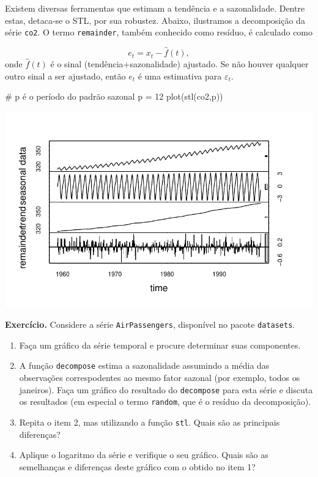 \documentclass[
  letterpaper,
  DIV=11,
  numbers=noendperiod]{scrreprt}
\newenvironment{Shaded}{\begin{snugshade}}{\end{snugshade}}
\newcommand{\CommentTok}[1]{\textcolor[rgb]{0.37,0.37,0.37}{#1}}
\newcommand{\DecValTok}[1]{\textcolor[rgb]{0.68,0.00,0.00}{#1}}
\newcommand{\FunctionTok}[1]{\textcolor[rgb]{0.28,0.35,0.67}{#1}}
\newcommand{\NormalTok}[1]{\textcolor[rgb]{0.00,0.23,0.31}{#1}}
\newcommand{\OtherTok}[1]{\textcolor[rgb]{0.00,0.23,0.31}{#1}}
\begin{document}
Existem diversas ferramentas que estimam a tendência e a sazonalidade.
Dentre estas, detaca-se o STL, por sua robustez. Abaixo, ilustramos a
decomposição da série \texttt{co2}. O termo \texttt{remainder}, também
conhecido como resíduo, é calculado como

\[e_t=x_t-\hat{f}(t),\] onde \(\hat{f}(t)\) é o sinal
(tendência+sazonalidade) ajustado. Se não houver qualquer outro sinal a
ser ajustado, então \(e_t\) é uma estimativa para \(\varepsilon_t\).

\begin{Shaded}
\begin{Highlighting}[]
\CommentTok{\# p é o período do padrão sazonal}
\NormalTok{p }\OtherTok{=} \DecValTok{12}
\FunctionTok{plot}\NormalTok{(}\FunctionTok{stl}\NormalTok{(co2,p))}
\end{Highlighting}
\end{Shaded}

\includegraphics{sinal_files/figure-pdf/unnamed-chunk-2-1.pdf}

\textbf{Exercício.} Considere a série \texttt{AirPassengers}, disponível
no pacote \texttt{datasets}.

\begin{enumerate}
\def\labelenumi{\arabic{enumi}.}
\item
  Faça um gráfico da série temporal e procure determinar suas
  componentes.
\item
  A função \texttt{decompose} estima a sazonalidade assumindo a média
  das observações correspodentes ao mesmo fator sazonal (por exemplo,
  todos os janeiros). Faça um gráfico do resultado do \texttt{decompose}
  para esta série e discuta os resultados (em especial o termo
  \texttt{random}, que é o resíduo da decomposição).
\item
  Repita o item 2, mas utilizando a função \texttt{stl}. Quais são as
  principais diferenças?
\item
  Aplique o logaritmo da série e verifique o seu gráfico. Quais são as
  semelhanças e diferenças deste gráfico com o obtido no item 1?
\end{enumerate}
\end{document}
